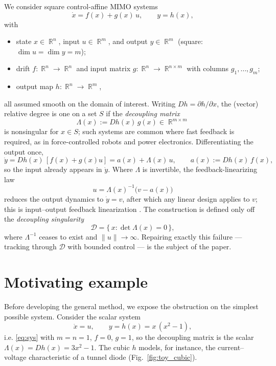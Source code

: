 \documentclass[11pt,american]{article}
\DeclareMathOperator{\R}{\mathbb{R}}
\theoremstyle{definition}
\theoremstyle{plain}
\theoremstyle{remark}
\begin{document}
We consider square control-affine MIMO systems
\begin{equation}\label{eq:sys}
\dot x = f(x) + g(x)\,u, \qquad y = h(x),
\end{equation}
with
\begin{itemize}
\item state $x \in \R^n$, input $u \in \R^m$, and output $y \in \R^m$ (square: $\dim u = \dim y = m$);
\item drift $f:\R^n\to\R^n$ and input matrix $g:\R^n\to\R^{n\times m}$ with columns $g_1,\dots,g_m$;
\item output map $h:\R^n\to\R^m$,
\end{itemize}
all assumed smooth on the domain of interest. Writing $Dh = \partial h/\partial x$, the (vector) relative degree is one on a set $S$ if the \emph{decoupling matrix}
\begin{equation}\label{eq:Lambda}
\Lambda(x) := Dh(x)\,g(x) \in \R^{m\times m}
\end{equation}
is nonsingular for $x\in S$; such systems are common where fast feedback is required, as in force-controlled robots and power electronics. Differentiating the output once,
\begin{equation}\label{eq:ydot}
\dot y = Dh(x)\,[f(x)+g(x)u] = a(x) + \Lambda(x)\,u, \qquad a(x) := Dh(x)\,f(x),
\end{equation}
so the input already appears in $\dot y$. Where $\Lambda$ is invertible, the feedback-linearizing law
\begin{equation}\label{eq:fl}
u = \Lambda(x)^{-1}\bigl(v - a(x)\bigr)
\end{equation}
reduces the output dynamics to $\dot y = v$, after which any linear design applies to $v$; this is input--output feedback linearization \cite{Isidori1995,SlotineLi1991,Khalil2002}. The construction is defined only off the \emph{decoupling singularity}
\begin{equation}
\mathcal D = \{\, x : \det\Lambda(x) = 0 \,\},
\end{equation}
where $\Lambda^{-1}$ ceases to exist and $\|u\|\to\infty$. Repairing exactly this failure --- tracking through $\mathcal D$ with bounded control --- is the subject of the paper.

\section{Motivating example}\label{sec:motivating}

Before developing the general method, we expose the obstruction on the simplest possible system. Consider the scalar system
\begin{equation}\label{toy_example}
\dot x = u, \qquad y = h(x) = x\,(x^2 - 1),
\end{equation}
i.e. \eqref{eq:sys} with $m = n = 1$, $f = 0$, $g = 1$, so the decoupling matrix is the scalar $\Lambda(x) = Dh(x) = 3x^2 - 1$. The cubic $h$ models, for instance, the current--voltage characteristic of a tunnel diode (Fig.~\ref{fig:toy_cubic}).
\end{document}
